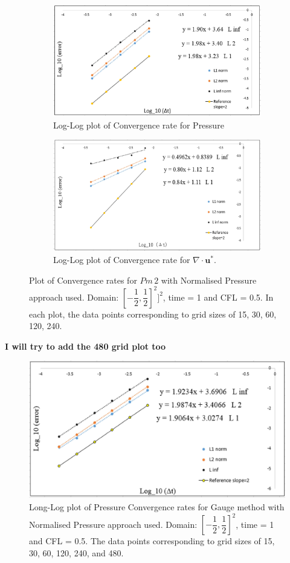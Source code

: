 \begin{figure}[H]
	\centering
	\begin{subfigure}[t]{4.5in}
		\centering
		\includegraphics[width=4.5in]{figures/Pm2_pf2b_np_P_rate_c_0_5.jpg}
		\caption{Log-Log plot of Convergence rate for Pressure}\label{fig:6.19a}		
	\end{subfigure}
	\quad
	\begin{subfigure}[t]{4.5in}
		\centering
		\includegraphics[width=4.5in]{figures/Pm2_pf2b_np_div_uvstar_rate_c_0_5.jpg}
		\caption{Log-Log plot of Convergence rate for $\nabla \cdot \textbf{u}^*$. }\label{fig:6.19b}
	\end{subfigure}
	\caption{Plot of Convergence rates for $Pm\,2$ with Normalised Pressure approach used. Domain: $[-\dfrac{1}{2}, \dfrac{1}{2}]^2]^2$, time = 1 and CFL = 0.5. In each plot, the data points corresponding to grid sizes of 15, 30, 60, 120, 240.}\label{fig:6.16}
\end{figure}
\textbf{I will try to add the 480 grid plot too}

\begin{figure}[H]
	\centering
	\includegraphics[width=4.5in]{figures/Gauge_pf2b_np_P_rate_c_0_5.jpg}
	\caption{Long-Log plot of Pressure Convergence rates for Gauge method with Normalised Pressure approach used. Domain: $[-\dfrac{1}{2},\dfrac{1}{2}]^2$, time = 1 and CFL = 0.5. The data points corresponding to grid sizes of 15, 30, 60, 120, 240, and 480.}\label{fig:6.16}
\end{figure}


